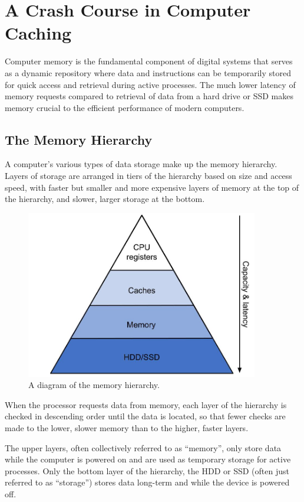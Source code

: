 \documentclass[12pt,twoside]{reedthesis}
\begin{document}
\section{A Crash Course in Computer Caching}

Computer memory is the fundamental component of digital systems that serves as a dynamic repository where data and instructions can be temporarily stored for quick access and retrieval during active processes. The much lower latency of memory requests compared to retrieval of data from a hard drive or SSD makes memory crucial to the efficient performance of modern computers.

	\subsection*{The Memory Hierarchy}

	A computer's various types of data storage make up the memory hierarchy. Layers of storage are arranged in tiers of the hierarchy based on size and access speed, with faster but smaller and more expensive layers of memory at the top of the hierarchy, and slower, larger storage at the bottom.
	\begin{figure}[h]
    	\centering
    	\includegraphics[width=4in]{figures/mem_hierarchy.jpg}
    	\caption{A diagram of the memory hierarchy.}
	\end{figure}

	When the processor requests data from memory, each layer of the hierarchy is checked in descending order until the data is located, so that fewer checks are made to the lower, slower memory than to the higher, faster layers.

	The upper layers, often collectively referred to as ``memory'', only store data while the computer is powered on and are used as temporary storage for active processes. Only the bottom layer of the hierarchy, the HDD or SSD (often just referred to as ``storage'') stores data long-term and while the device is powered off.
\end{document}
